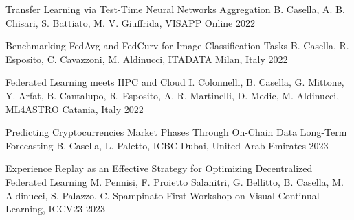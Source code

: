 



\begin{cvhonors}

  \cvhonor
    {Transfer Learning via Test-Time Neural Networks Aggregation} %
    {B. Casella, A. B. Chisari, S. Battiato, M. V. Giuffrida, VISAPP} %
    {Online} %
    {2022} %

  \cvhonor
    {Benchmarking FedAvg and FedCurv for Image Classification Tasks} %
    {B. Casella, R. Esposito, C. Cavazzoni, M. Aldinucci, ITADATA} %
    {Milan, Italy} %
    {2022} %

  \cvhonor
    {Federated Learning meets HPC and Cloud} %
    {I. Colonnelli, B. Casella, G. Mittone, Y. Arfat, B. Cantalupo, R. Esposito, A. R. Martinelli, D. Medic, M. Aldinucci, ML4ASTRO} %
    {Catania, Italy} %
    {2022} %

  \cvhonor
    {Predicting Cryptocurrencies Market Phases Through On-Chain Data Long-Term Forecasting} %
    {B. Casella, L. Paletto, ICBC} %
    {Dubai, United Arab Emirates} %
    {2023} %
    
  \cvhonor
    {Experience Replay as an Effective Strategy for Optimizing Decentralized Federated Learning} %
    {M. Pennisi, F. Proietto Salanitri, G. Bellitto, B. Casella, M. Aldinucci, S. Palazzo, C. Spampinato} %
    {First Workshop on Visual Continual Learning, ICCV23} %
    {2023} %

\end{cvhonors}


